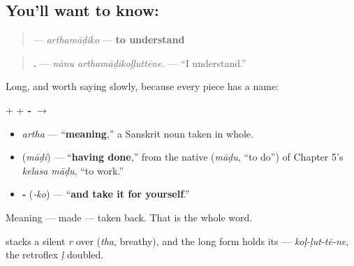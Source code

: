 \subsection*{You'll want to know: }
\begin{quote}
\textbf{} — \emph{arthamāḍiko} — \textbf{to understand}
\end{quote}

\begin{quote}
\textbf{ .} — \emph{nānu arthamāḍikoḷḷuttēne.} — \textquotedblleft{}I understand.\textquotedblright{}
\end{quote}

Long, and worth saying slowly, because every piece has a name:

\textbf{} + \textbf{} + \textbf{‑} $\to$ \textbf{}

\begin{itemize}
\raggedright
  \item \emph{artha} — \textquotedblleft{}\textbf{meaning},\textquotedblright{} a Sanskrit noun taken in whole.
  \item \textbf{} (\emph{māḍi}) — \textquotedblleft{}\textbf{having done},\textquotedblright{} from the native \textbf{} (\emph{māḍu}, \textquotedblleft{}to do\textquotedblright{}) of Chapter 5's \emph{kelasa māḍu}, \textquotedblleft{}to work.\textquotedblright{}
  \item \textbf{‑} (\emph{‑ko}) — \textquotedblleft{}\textbf{and take it for yourself}.\textquotedblright{}
\end{itemize}

Meaning — made — taken back. That is the whole word.

\begin{sounds}
\textbf{} stacks a silent \emph{r} over \textbf{} (\emph{tha}, breathy), and the long form holds its \textbf{} — \emph{koḷ-ḷut-tē-ne}, the retroflex \emph{ḷ} doubled.
\end{sounds}

